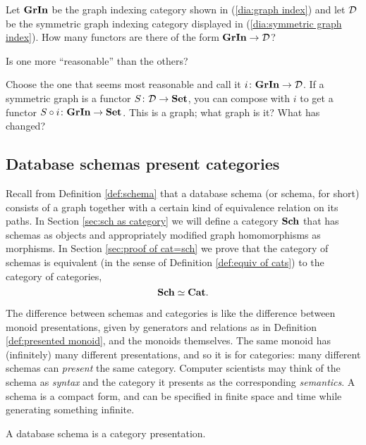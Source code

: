 \begin{exercise}
Let ${\bf GrIn}$ be the graph indexing category shown in (\ref{dia:graph index}) and let $\mathcal{D}$ be the symmetric graph indexing category displayed in (\ref{dia:symmetric graph index}).
\sexc How many functors are there of the form ${\bf GrIn}\rightarrow\mathcal{D}$?
\item Is one more “reasonable” than the others? 
\item Choose the one that seems most reasonable and call it $i\colon{\bf GrIn}\rightarrow\mathcal{D}$. If a symmetric graph is a functor $S\colon\mathcal{D}\rightarrow{\bf Set}$, you can compose with $i$ to get a functor $S\circ i\colon{\bf GrIn}\rightarrow{\bf Set}$. This is a graph; what graph is it? What has changed?
\endsexc
\end{exercise}


\subsection{Database schemas present categories}\label{sec:schemas and cats intro}

Recall from Definition \ref{def:schema} that a database schema (or schema, for short) consists of a graph together with a certain kind of equivalence relation on its paths. In Section \ref{sec:sch as category} we will define a category ${\bf Sch}$ that has schemas as objects and appropriately modified graph homomorphisms as morphisms. In Section \ref{sec:proof of cat=sch} we prove that the category of schemas is equivalent (in the sense of Definition \ref{def:equiv of cats}) to the category of categories, $${\bf Sch}\simeq{\bf Cat}.$$

The difference between schemas and categories is like the difference between monoid presentations, given by generators and relations as in Definition \ref{def:presented monoid}, and the monoids themselves. The same monoid has (infinitely) many different presentations, and so it is for categories: many different schemas can {\em present} the same category. Computer scientists may think of the schema as {\em syntax} and the category it presents as the corresponding {\em semantics}. A schema is a compact form, and can be specified in finite space and time while generating something infinite. 

\begin{slogan}
A database schema is a category presentation.
\end{slogan}

